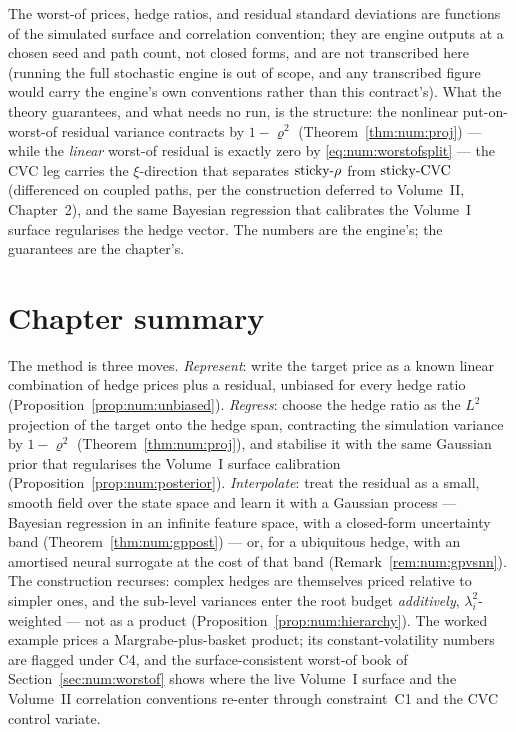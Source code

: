 \begin{remark}\label{rem:num:worstofnumbers}
The worst-of prices, hedge ratios, and residual standard deviations are
functions of the simulated surface and correlation convention; they are engine
outputs at a chosen seed and path count, not closed forms, and are not
transcribed here (running the full stochastic engine is out of scope, and any
transcribed figure would carry the engine's own conventions rather than this
contract's). What the theory guarantees, and what needs no run, is the
structure: the nonlinear put-on-worst-of residual variance contracts by
$1-\varrho^2$ (Theorem~\ref{thm:num:proj}) --- while the \emph{linear} worst-of
residual is exactly zero by \eqref{eq:num:worstofsplit} --- the CVC leg carries
the $\xi$-direction that separates $\textnormal{sticky-}\rho$ from $\textnormal{sticky-CVC}$ (differenced on
coupled paths, per the construction deferred to Volume~II, Chapter~2), and the
same Bayesian regression that calibrates the Volume~I surface regularises the
hedge vector. The numbers are the engine's; the guarantees are the chapter's.
\end{remark}

\section*{Chapter summary}

The method is three moves. \emph{Represent}: write the target price as a known
linear combination of hedge prices plus a residual, unbiased for every hedge
ratio (Proposition~\ref{prop:num:unbiased}). \emph{Regress}: choose the hedge
ratio as the $L^2$ projection of the target onto the hedge span, contracting the
simulation variance by $1-\varrho^2$ (Theorem~\ref{thm:num:proj}), and stabilise
it with the same Gaussian prior that regularises the Volume~I surface
calibration (Proposition~\ref{prop:num:posterior}). \emph{Interpolate}: treat the
residual as a small, smooth field over the state space and learn it with a
Gaussian process --- Bayesian regression in an infinite feature space, with a
closed-form uncertainty band (Theorem~\ref{thm:num:gppost}) --- or, for a
ubiquitous hedge, with an amortised neural surrogate at the cost of that band
(Remark~\ref{rem:num:gpvsnn}). The construction recurses: complex hedges are
themselves priced relative to simpler ones, and the sub-level variances enter the
root budget \emph{additively}, $\lambda_i^2$-weighted --- not as a product
(Proposition~\ref{prop:num:hierarchy}). The worked example prices a
Margrabe-plus-basket product; its constant-volatility numbers are flagged under
C4, and the surface-consistent worst-of book of Section~\ref{sec:num:worstof}
shows where the live Volume~I surface and the Volume~II correlation conventions
re-enter through constraint~C1 and the CVC control variate.


